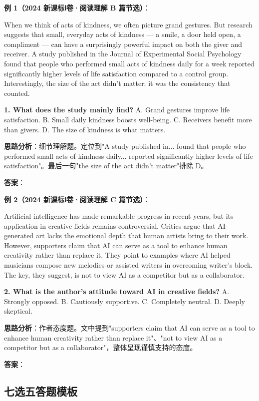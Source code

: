 \textbf{例 1（2024 新课标Ⅰ卷·阅读理解 B 篇节选）}：

When we think of acts of kindness, we often picture grand gestures. But research suggests that small, everyday acts of kindness — a smile, a door held open, a compliment — can have a surprisingly powerful impact on both the giver and receiver. A study published in the Journal of Experimental Social Psychology found that people who performed small acts of kindness daily for a week reported significantly higher levels of life satisfaction compared to a control group. Interestingly, the size of the act didn't matter; it was the consistency that counted.

\textbf{1. What does the study mainly find?}
A. Grand gestures improve life satisfaction.
B. Small daily kindness boosts well-being.
C. Receivers benefit more than givers.
D. The size of kindness is what matters.

\textbf{思路分析}：细节理解题。定位到"A study published in... found that people who performed small acts of kindness daily... reported significantly higher levels of life satisfaction"。最后一句"the size of the act didn't matter"排除 D。

\textbf{答案}：

\textbf{例 2（2024 新课标Ⅰ卷·阅读理解 C 篇节选）}：

Artificial intelligence has made remarkable progress in recent years, but its application in creative fields remains controversial. Critics argue that AI-generated art lacks the emotional depth that human artists bring to their work. However, supporters claim that AI can serve as a tool to enhance human creativity rather than replace it. They point to examples where AI helped musicians compose new melodies or assisted writers in overcoming writer's block. The key, they suggest, is not to view AI as a competitor but as a collaborator.

\textbf{2. What is the author's attitude toward AI in creative fields?}
A. Strongly opposed. \quad B. Cautiously supportive.
C. Completely neutral. \quad D. Deeply skeptical.

\textbf{思路分析}：作者态度题。文中提到"supporters claim that AI can serve as a tool to enhance human creativity rather than replace it"、"not to view AI as a competitor but as a collaborator"，整体呈现谨慎支持的态度。

\textbf{答案}：

\subsection{七选五答题模板}

